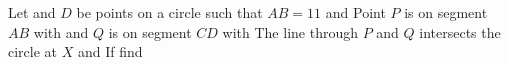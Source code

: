 Let    and $D$ be points on a circle such that $AB=11$ and   Point $P$ is on segment $AB$ with  and $Q$ is on segment $CD$ with   The line through $P$ and $Q$ intersects the circle at $X$ and   If  find 